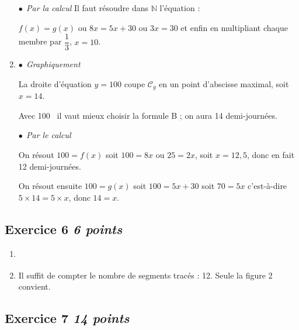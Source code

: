 \documentclass[10pt]{article}
\newcommand{\euro}{\eurologo{}}
\newcommand{\N}{\mathbb{N}}
\begin{document}
\begin{enumerate}
    $\bullet~~$\emph{Par la calcul} Il faut résoudre dans $\N$ l'équation : 
    
    $f(x) = g(x)$ ou $8x = 5x + 30$ ou $3x = 30$ et enfin en multipliant chaque membre par $\dfrac{1}{3}$, \: $x = 10$.
    \item %
    
    $\bullet~~$\emph{Graphiquement} 
    
    La droite d'équation $y = 100$ coupe $\mathcal{C}_g$ en un point d'abscisse maximal, soit $x = 14$.
    
    Avec 100~\euro{} il vaut mieux choisir la formule B ; on aura 14 demi-journées.
    
    $\bullet~~$\emph{Par le calcul}
    
    On résout $100 = f(x)$ soit $100 = 8x$ ou $25 = 2x$, soit $x = 12,5$, donc en fait 12 demi-journées.
    
    On résout ensuite $100 = g(x)$ soit $100 = 5x + 30$ soit $70 = 5x$ c'est-à-dire $5 \times 14 = 5 \times x$, donc $14 = x$.
    \end{enumerate}





\subsection*{Exercice 6 \hfill \textit{6 points}}


\begin{enumerate}
\item \begin{scratch}
    {
    }
    \end{scratch}

\item Il suffit de compter le nombre de segments tracés : 12. Seule la figure 2 convient.
\end{enumerate}

\subsection*{Exercice 7 \hfill \textit{14 points}}
\end{document}

